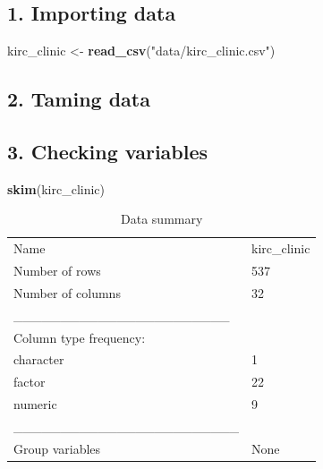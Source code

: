 \documentclass[]{article}
\newenvironment{Shaded}{\begin{snugshade}}{\end{snugshade}}
\newcommand{\KeywordTok}[1]{\textcolor[rgb]{0.13,0.29,0.53}{\textbf{#1}}}
\newcommand{\DataTypeTok}[1]{\textcolor[rgb]{0.13,0.29,0.53}{#1}}
\newcommand{\StringTok}[1]{\textcolor[rgb]{0.31,0.60,0.02}{#1}}
\newcommand{\OperatorTok}[1]{\textcolor[rgb]{0.81,0.36,0.00}{\textbf{#1}}}
\newcommand{\NormalTok}[1]{#1}
\begin{document}
\subsection{1. Importing data}\label{importing-data}

\begin{Shaded}
\begin{Highlighting}[]
\NormalTok{kirc_clinic <-}\StringTok{ }\KeywordTok{read_csv}\NormalTok{(}\StringTok{"data/kirc_clinic.csv"}\NormalTok{)}
\end{Highlighting}
\end{Shaded}

\subsection{2. Taming data}\label{taming-data}

\begin{Shaded}
\end{Shaded}

\subsection{3. Checking variables}\label{checking-variables}

\begin{Shaded}
\begin{Highlighting}[]
\KeywordTok{skim}\NormalTok{(kirc_clinic) }
\end{Highlighting}
\end{Shaded}

\begin{longtable}[]{@{}ll@{}}
\caption{Data summary}\tabularnewline
\toprule
Name & kirc\_clinic\tabularnewline
Number of rows & 537\tabularnewline
Number of columns & 32\tabularnewline
\_\_\_\_\_\_\_\_\_\_\_\_\_\_\_\_\_\_\_\_\_\_\_ &\tabularnewline
Column type frequency: &\tabularnewline
character & 1\tabularnewline
factor & 22\tabularnewline
numeric & 9\tabularnewline
\_\_\_\_\_\_\_\_\_\_\_\_\_\_\_\_\_\_\_\_\_\_\_\_ &\tabularnewline
Group variables & None\tabularnewline
\bottomrule
\end{longtable}
\end{document}

